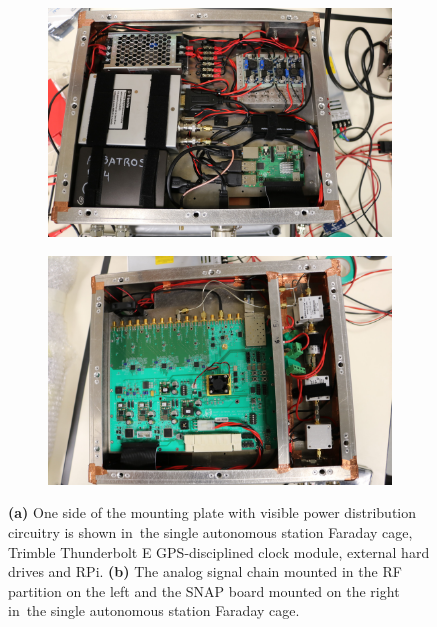 \begin{figure}
	\centering
	\begin{subfigure}[t]{0.52\textwidth}
		\centering
		\includegraphics[width=\linewidth]{Figures/46966493985_44aa8ac326_o} 
		\caption{} \label{Fig:46966493985_44aa8ac326_o}
	\end{subfigure}
	\hfill
	\begin{subfigure}[t]{0.47\textwidth}
		\centering
		\includegraphics[width=\linewidth]{Figures/47882594521_3895effd86_o}
		\caption{} \label{Fig:47882594521_3895effd86_o}
	\end{subfigure}
	\caption{{\bf (a)} One side of the mounting plate with visible power distribution circuitry is shown in the single autonomous station Faraday cage, Trimble Thunderbolt E GPS-disciplined clock module, external hard drives and RPi. {\bf (b)} The analog signal chain mounted in the RF partition on the left and the SNAP board mounted on the right in the single autonomous station Faraday cage.} \label{Fig:faraday}
\end{figure}

